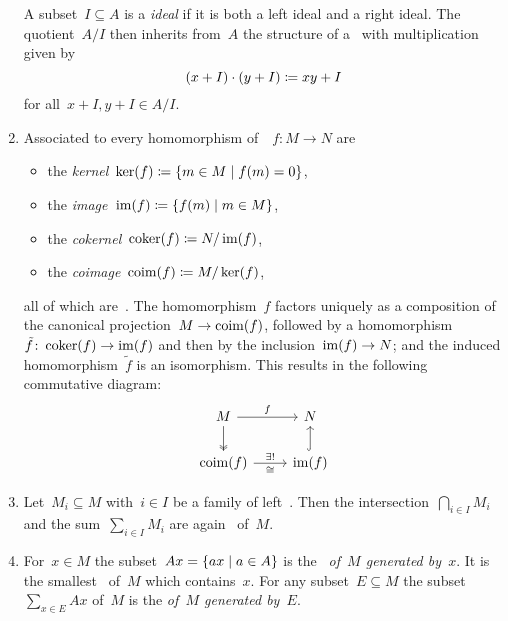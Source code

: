 \begin{remarkdefinition}
\begin{enumerate}
      A subset~$I \subseteq A$ is a \emph{{\twosided} ideal} if it is both a left ideal and a right ideal.
      The quotient~$A/I$ then inherits from~$A$ the structure of a~{\kalg} with multiplication given by
      \[
                  (x + I) \cdot (y + I)
        \coloneqq  xy + I
      \]
      for all~$x + I, y + I \in A/I$.
    \item
      Associated to every homomorphism of~{}~$f \colon M \to N$ are
      \begin{itemize}
        \item
          the \emph{kernel}~$\ker(f) \defined \{m \in M \suchthat f(m) = 0\}$,
        \item
          the \emph{image}~$\im(f) \defined \{f(m) \suchthat m \in M\}$,
        \item
          the \emph{cokernel}~$\operatorname{coker}(f) \coloneqq N/\operatorname{im}(f)$,
        \item
          the \emph{coimage}~$\operatorname{coim}(f) \coloneqq M/\ker(f)$,
      \end{itemize}
      all of which are~{}.
      The homomorphism~$f$ factors uniquely as a composition of the canonical projection~$M \to \operatorname{coim}(f)$, followed by a homomorphism~$\tilde{f} \colon \operatorname{coker}(f) \to \operatorname{im}(f)$ and then by the inclusion~$\operatorname{im}(f) \to N$; and the induced homomorphism~$\tilde{f}$ is an isomorphism.
      This results in the following commutative diagram:
      \[
        \begin{tikzcd}
            M
            \arrow{r}[above]{f}
            \arrow[two heads]{d}
          & N
          \\
            \coim(f)
            \arrow{r}[above]{\exists!}[below]{\cong}
          & \im(f)
            \arrow[hook]{u}
        \end{tikzcd}
      \]
    \item
      Let~$M_i \subseteq M$ with~$i \in I$ be a family of left~{}.
      Then the intersection~$\bigcap_{i \in I} M_i$ and the sum~$\sum_{i \in I} M_i$ are again~{} of~$M$.
    \item
      For~$x \in M$ the subset~$Ax = \{ax \suchthat a \in A\}$ is the~\emph{{} of~$M$ generated by~$x$}.
      It is the smallest~{} of~$M$ which contains~$x$.
      For any subset~$E \subseteq M$ the subset~$\sum_{x \in E} Ax$ of~$M$ is the \emph{{} of~$M$ generated by~$E$}.

\end{enumerate}
\end{remarkdefinition}
